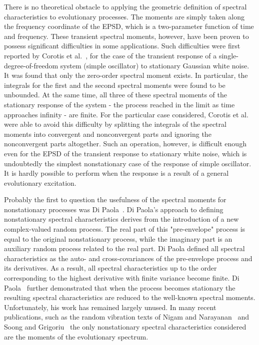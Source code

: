 \documentclass[12pt]{article}
\begin{document}
There is no theoretical obstacle to applying the geometric definition of spectral characteristics to evolutionary processes. The moments are simply taken along the frequency coordinate of the EPSD, which is a two-parameter function of time and frequency. These transient spectral moments, however, have been proven to possess significant difficulties in some applications. Such difficulties were first reported by Corotis et al.~\cite{Corotis1972}, for the case of the transient response of a single-degree-of-freedom system (simple oscillator) to stationary Gaussian white noise. It was found that only the zero-order spectral moment exists. In particular, the integrals for the first and the second spectral moments were found to be unbounded. At the same time, all three of these spectral moments of the stationary response of the system - the process reached in the limit as time approaches infinity - are finite. For the particular case considered, Corotis et al.~\cite{Corotis1972} were able to avoid this difficulty by splitting the integrals of the spectral moments into convergent and nonconvergent parts and ignoring the nonconvergent parts altogether. Such an operation, however, is difficult enough even for the EPSD of the transient response to stationary white noise, which is undoubtedly the simplest nonstationary case of the response of simple oscillator. It is hardly possible to perform when the response is a result of a general evolutionary excitation.

Probably the first to question the usefulness of the spectral moments for nonstationary processes was Di Paola~\cite{DiPaola1985}. Di Paola's approach to defining nonstationary spectral characteristics derives from the introduction of a new complex-valued random process. The real part of this "pre-envelope" process is equal to the original nonstationary process, while the imaginary part is an auxiliary random process related to the real part. Di Paola defined all spectral characteristics as the auto- and cross-covariances of the pre-envelope process and its derivatives. As a result, all spectral characteristics up to the order corresponding to the highest derivative with finite variance become finite. Di Paola~\cite{DiPaola1985} further demonstrated that when the process becomes stationary the resulting spectral characteristics are reduced to the well-known spectral moments. Unfortunately, his work has remained largely unused. In many recent publications, such as the random vibration texts of Nigam and Narayanan~\cite{NigamNarayanan1994} and Soong and Grigoriu~\cite{SoongGrigoriu1993} the only nonstationary spectral characteristics considered are the moments of the evolutionary spectrum.
\end{document}
